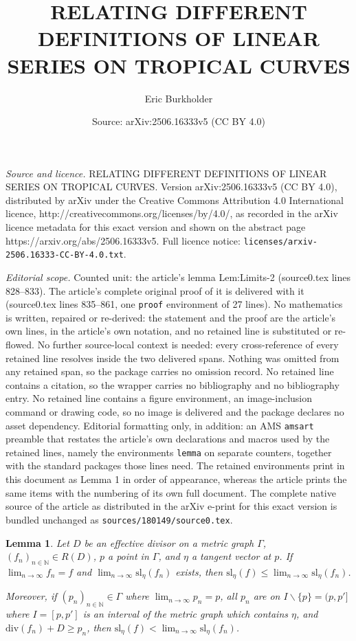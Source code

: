 \documentclass[10pt,a4paper]{amsart}
\title{RELATING DIFFERENT DEFINITIONS OF LINEAR SERIES ON TROPICAL CURVES}
\author{Eric Burkholder}
\date{Source: arXiv:2506.16333v5 (CC BY 4.0)}
\newtheorem{lemma}{Lemma}
\begin{document}
\maketitle

\noindent\emph{Source and licence.} RELATING DIFFERENT DEFINITIONS OF LINEAR SERIES ON TROPICAL CURVES. Version arXiv:2506.16333v5 (CC BY 4.0), distributed by arXiv under the Creative Commons Attribution 4.0 International licence, http://creativecommons.org/licenses/by/4.0/, as recorded in the arXiv licence metadata for this exact version and shown on the abstract page https://arxiv.org/abs/2506.16333v5. Full licence notice: \texttt{licenses/arxiv-2506.16333-CC-BY-4.0.txt}.\par\smallskip

\noindent\textit{Editorial scope.} Counted unit: the article's lemma Lem:Limits-2 (source0.tex lines 828--833). The article's complete original proof of it is delivered with it (source0.tex lines 835--861, one \texttt{proof} environment of 27 lines). No mathematics is written, repaired or re-derived: the statement and the proof are the article's own lines, in the article's own notation, and no retained line is substituted or re-flowed.  No further source-local context is needed: every cross-reference of every retained line resolves inside the two delivered spans.  Nothing was omitted from any retained span, so the package carries no omission record.  No retained line contains a citation, so the wrapper carries no bibliography and no bibliography entry.  No retained line contains a figure environment, an image-inclusion command or drawing code, so no image is delivered and the package declares no asset dependency.  Editorial formatting only, in addition: an AMS \texttt{amsart} preamble that restates the article's own declarations and macros used by the retained lines, namely the environments \texttt{lemma} on separate counters, together with the standard packages those lines need.  The retained environments print in this document as Lemma 1 in order of appearance, whereas the article prints the same items with the numbering of its own full document.  The complete native source of the article as distributed in the arXiv e-print for this exact version is bundled unchanged as \texttt{sources/180149/source0.tex}.
	\begin{lemma}
		\label{Lem:Limits-2}
		Let $D$ be an effective divisor on a metric graph $\Gamma$, $(f_n)_{n \in \mathbb{N}} \in R(D)$, $p$ a point in $\Gamma$, and $\eta$ a tangent vector at $p$. If $\displaystyle \lim_{n \to \infty} f_n = f$ and $\displaystyle \lim_{n \to \infty} \mathrm{sl}_{\eta}(f_n)$ exists, then $\displaystyle \mathrm{sl}_{\eta}(f) \leq \lim_{n \to \infty} \mathrm{sl}_{\eta}(f_n)$.
		
		Moreover, if $(p_n)_{n \in \mathbb{N}} \in \Gamma$ where $\displaystyle \lim_{n \to \infty} p_n = p$, all $p_n$ are on $I \backslash \{ p \} = (p,p']$ where $I = [p,p']$ is an interval of the metric graph which contains $\eta$, and $\mathrm{div}(f_n) + D \geq p_n$, then $\displaystyle \mathrm{sl}_{\eta}(f) < \lim_{n \to \infty} \mathrm{sl}_{\eta}(f_n)$.
	\end{lemma}
\end{document}

